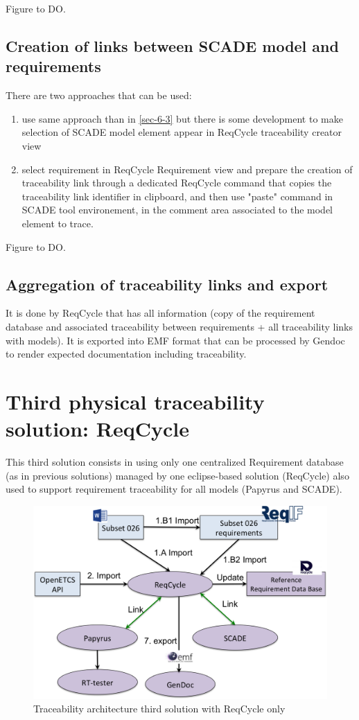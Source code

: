\documentclass[11pt]{template/openetcs_report}
\begin{document}
Figure to DO.

\section{Creation of links between SCADE model and requirements}
\label{sec-6-4}
There are two approaches that can be used: 
\begin{enumerate}
\item use same approach than in \ref{sec-6-3} but there is some development to make selection of SCADE model element appear in ReqCycle traceability creator view
\item select requirement in ReqCycle Requirement view and prepare the creation of traceability link through a dedicated ReqCycle command that copies the traceability link identifier in clipboard, and then use "paste" command in SCADE tool environement, in the comment area associated to the model element to trace.
\end{enumerate} 

Figure to DO.

\section{Aggregation of traceability links and export}
\label{sec-6-5}
It is done by ReqCycle that has all information (copy of the requirement database and associated traceability between requirements + all traceability links with models).
It is exported into EMF format that can be processed by Gendoc to render expected documentation including traceability.

\chapter{Third physical traceability solution: ReqCycle}
\label{sec-7}
This third solution consists in using only one centralized Requirement database (as in previous solutions) managed by one eclipse-based solution (ReqCycle) also used to support requirement traceability for all models (Papyrus and SCADE).

\begin{figure}[htb]
\centering
\includegraphics[width=.9\linewidth]{images/Third-Solution-ReqCycle.png}
\caption{\label{fig:trace_third}Traceability architecture third solution with ReqCycle only}
\end{figure}
\end{document}
